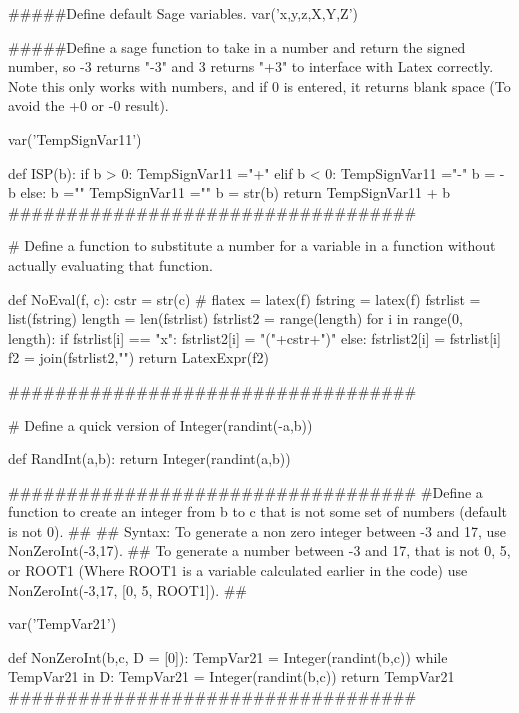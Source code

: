 
\begin{sagesilent}
#####Define default Sage variables.
var('x,y,z,X,Y,Z')


#####Define a sage function to take in a number and return the signed number, so -3 returns "-3" and 3 returns "+3" to interface with Latex correctly. Note this only works with numbers, and if 0 is entered, it returns blank space (To avoid the +0 or -0 result).

var('TempSignVar11')

def ISP(b):
   if b > 0:
      TempSignVar11 ="+" 
   elif b < 0:
      TempSignVar11 ="-"
      b = -b
   else:
      b =""
      TempSignVar11 =""
   b = str(b)
   return TempSignVar11 + b
###################################

# Define a function to substitute a number for a variable in a function without actually evaluating that function.

def NoEval(f, c):
    cstr = str(c)
#    flatex = latex(f)
    fstring = latex(f)
    fstrlist = list(fstring)
    length = len(fstrlist)
    fstrlist2 = range(length)
    for i in range(0, length):
        if fstrlist[i] == "x":
            fstrlist2[i] = "("+cstr+")"
        else:
            fstrlist2[i] = fstrlist[i]
    f2 = join(fstrlist2,"")
    return LatexExpr(f2)

###################################

# Define a quick version of Integer(randint(-a,b))

def RandInt(a,b):
    return Integer(randint(a,b))



###################################
#Define a function to create an integer from b to c that is not some set of numbers (default is not 0).
## 
## Syntax: To generate a non zero integer between -3 and 17, use NonZeroInt(-3,17).
## To generate a number between -3 and 17, that is not 0, 5, or ROOT1 (Where ROOT1 is a variable calculated earlier in the code) use NonZeroInt(-3,17, [0, 5, ROOT1]).
## 


var('TempVar21')

def NonZeroInt(b,c, D = [0]):
   TempVar21 = Integer(randint(b,c))
   while TempVar21 in D:
      TempVar21 = Integer(randint(b,c))
   return TempVar21
###################################



\end{sagesilent}
